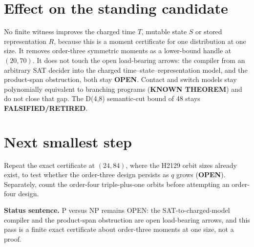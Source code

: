 \documentclass[11pt]{article}
\begin{document}
\section*{Effect on the standing candidate}
No finite witness improves the charged time $T$, mutable state $S$ or stored representation $R$, because this is a moment certificate for one distribution at one size. It removes order-three symmetric moments as a lower-bound handle at $(20,70)$. It does not touch the open load-bearing arrows: the compiler from an arbitrary SAT decider into the charged time--state--representation model, and the product-span obstruction, both stay \textbf{OPEN}. Contact and switch models stay polynomially equivalent to branching programs (\textbf{KNOWN THEOREM}) and do not close that gap. The D(4,8) semantic-cut bound of 48 stays \textbf{FALSIFIED/RETIRED}.

\section*{Next smallest step}
Repeat the exact certificate at $(24,84)$, where the H2129 orbit sizes already exist, to test whether the order-three design persists as $q$ grows (\textbf{OPEN}). Separately, count the order-four triple-plus-one orbits before attempting an order-four design.

\bigskip
\noindent\textbf{Status sentence.} P versus NP remains OPEN: the SAT-to-charged-model compiler and the product-span obstruction are open load-bearing arrows, and this pass is a finite exact certificate about order-three moments at one size, not a proof.
\end{document}
